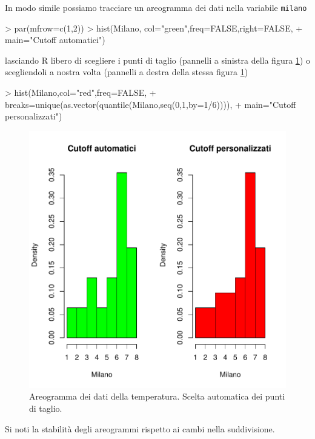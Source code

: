 \documentclass[onecolumn,12pt]{book}
\begin{document}
In modo simile possiamo tracciare un areogramma  dei dati nella variabile \texttt{milano}
\begin{Schunk}
\begin{Sinput}
> par(mfrow=c(1,2))
> hist(Milano, col="green",freq=FALSE,right=FALSE,
+ main="Cutoff automatici")
\end{Sinput}
\end{Schunk}
lasciando \textsf{R} libero di scegliere i punti di taglio (pannelli a sinistra della figura \ref{fig:datiistmilano}) o scegliendoli a nostra volta (pannelli a destra della stessa figura  \ref{fig:datiistmilano})
\begin{Schunk}
\begin{Sinput}
> hist(Milano,col="red",freq=FALSE,
+ breaks=unique(as.vector(quantile(Milano,seq(0,1,by=1/6)))),
+ main="Cutoff personalizzati")
\end{Sinput}
\end{Schunk}
\begin{figure}[htbp]
\begin{center}
\includegraphics{RbookParte2-040}
\caption{ Areogramma dei dati della temperatura. Scelta automatica dei punti di taglio.}
\label{fig:datiistmilano}
\end{center}
\end{figure}
Si noti la stabilit\`a degli areogrammi rispetto ai cambi nella suddivisione.
\end{document}

